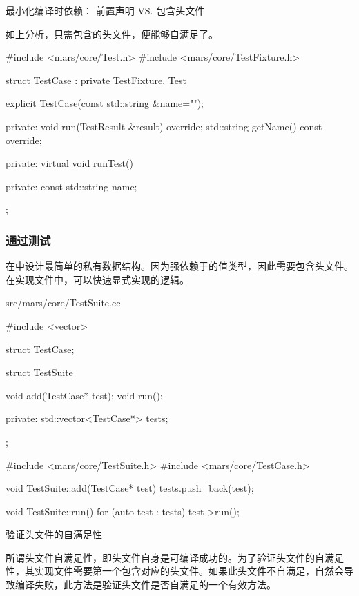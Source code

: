 \begin{content}
\begin{episode}{最小化编译时依赖： 前置声明 VS. 包含头文件}
\begin{content}
如上分析，只需包含的头文件，便能够自满足了。

\begin{c++}[title={\ttfamily{验证头文件的自满足性: include/mars/core/TestCase.h}}]
#include <mars/core/Test.h>
#include <mars/core/TestFixture.h>

struct TestCase : private TestFixture, Test {
  explicit TestCase(const std::string &name="");
    
private:
  void run(TestResult &result) override;
  std::string getName() const override;

private:
  virtual void runTest() {}
    
private:
  const std::string name;
};
\end{c++}

\end{content}
\end{episode}

\subsubsection{通过测试}

在中设计最简单的私有数据结构。因为强依赖于的值类型，因此需要包含头文件。在实现文件中，可以快速显式实现的逻辑。

\begin{diff}{src/mars/core/TestSuite.cc}
 \begin{minicpp}
#include <vector>

struct TestCase;

struct TestSuite {
  void add(TestCase* test);
  void run();

private:
  std::vector<TestCase*> tests;
};
 \end{minicpp}
\tcblower
 \begin{minicpp}
#include <mars/core/TestSuite.h>
#include <mars/core/TestCase.h>

void TestSuite::add(TestCase* test) {
  tests.push_back(test);
}

void TestSuite::run() {
  for (auto test : tests) {
    test->run();
  }
}
 \end{minicpp}
\end{diff}

\begin{episode}{验证头文件的自满足性}
\begin{content}

所谓头文件自满足性，即头文件自身是可编译成功的。为了验证头文件的自满足性，其实现文件需要第一个包含对应的头文件。如果此头文件不自满足，自然会导致编译失败，此方法是验证头文件是否自满足的一个有效方法。


\end{content}
\end{episode}
\end{content}
